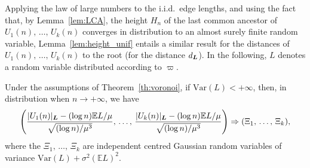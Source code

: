 \documentclass[AHL,Unicode,longabstracts,published]{cedram}
\newcommand{\bs}{\ensuremath{\boldsymbol}}
\newcommand{\bbE}{\mathbb{E}}
\newcommand{\Var}{\mathrm{Var}}
\begin{document}
Applying the law of large numbers to the i.i.d.\ edge lengths, and using the fact that, by Lemma~\ref{lem:LCA}, the height $H_n$ of the last common ancestor of $U_1(n),\,\ldots,\,U_k(n)$ converges in distribution to an almost surely finite random variable, Lemma~\ref{lem:height_unif} entails a similar result for the distances of $U_1(n),\,\ldots,\,U_k(n)$ to the root (for the distance $d_{\bs L}$). In the following, $L$ denotes a random variable distributed according to $\varpi.$

\begin{lemm}\label{lem:real_heights_finite_var}
Under the assumptions of Theorem~\ref{th:voronoi}, if $\Var(L)<+\infty$, then, in distribution when $n\to+\infty$, we have
\[
\left(\frac{|U_1(n)|_{\bs L} - (\log n)\bbE L/\mu}{\sqrt{(\log n)/\mu^3}},\,\ldots,\,
\frac{|U_k(n)|_{\bs L} - (\log n)\bbE L/\mu}{\sqrt{(\log n)/\mu^3}}
\right)\Rightarrow (\Xi_1, \,\ldots,\, \Xi_k),
\]
where the $\Xi_1,\, \ldots, \,\Xi_k$ are independent centred Gaussian random variables of variance $\Var(L)+\sigma^2(\bbE L)^2$.
\end{lemm}
\end{document}
